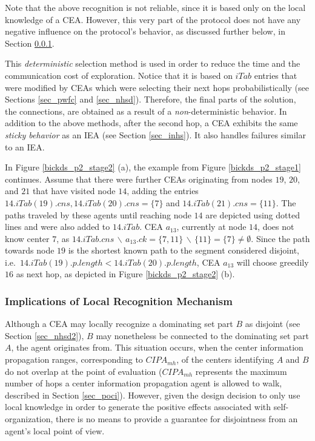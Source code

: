 Note that the above recognition is not reliable, since it is based only on the local knowledge of a CEA. However, this very part of the protocol does not have any negative influence on the protocol's behavior, as discussed further below, in Section \ref{sec_iolr}.

This \emph{deterministic} selection method is used in order to reduce the time and the communication cost of exploration. Notice that it is based on $iTab$ entries that were modified by CEAs which were selecting their next hops probabilistically (see Sections \ref{sec_pwfc} and \ref{sec_nhsd}). Therefore, the final parts of the solution, the connections, are obtained as a result of a \emph{non}-deterministic behavior. 
In addition to the above methods, after the second hop, a CEA exhibits the same \emph{sticky behavior} as an IEA (see Section \ref{sec_inhs}). It also handles failures similar to an IEA.


\exampleBegin

In Figure \ref{bickds_p2_stage2} (a), the example from Figure \ref{bickds_p2_stage1} continues. Assume that there were further CEAs originating from nodes $19$, $20$, and $21$ that have visited node $14$, adding the entries $14.iTab(19).cns, 14.iTab(20).cns=\{7\}$ and $14.iTab(21).cns=\{11\}$. The paths traveled by these agents until reaching node $14$ are depicted using dotted lines and were also added to $14.iTab$. CEA $a_{13}$, currently at node $14$, does not know center $7$, as $14.iTab.cns \,\backslash\, a_{13}.ck=\{7,11\}\,\backslash\,\{11\}=\{7\}\neq\emptyset$. Since the path towards node $19$ is the shortest known path to the segment considered disjoint, i.e.\ $14.iTab(19).p.length < 14.iTab(20).p.length$, CEA $a_{13}$ will choose greedily $16$ as next hop, as depicted in Figure \ref{bickds_p2_stage2} (b).

\exampleEnd



\subsubsection{Implications of Local Recognition Mechanism}\label{sec_iolr}

Although a CEA may locally recognize a dominating set part $B$ as disjoint (see Section \ref{sec_nhsd2}), $B$ may nonetheless be connected to the dominating set part $A$, the agent originates from. This situation occurs, when the center information propagation ranges, corresponding to $CIPA_{mh}$, of the centers identifying $A$ and $B$ do not overlap at the point of evaluation ($CIPA_{mh}$ represents the maximum number of hops a center information propagation agent is allowed to walk, described in Section \ref{sec_poci}). However, given the design decision to only use local knowledge in order to generate the positive effects associated with self-organization, there is no means to provide a guarantee for disjointness from an agent's local point of view.

